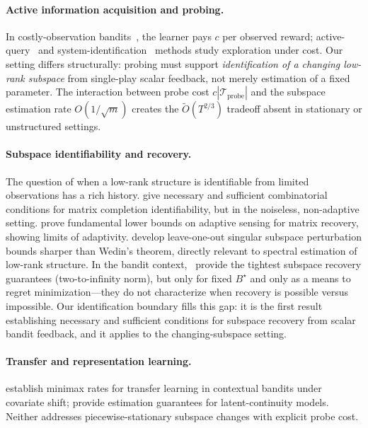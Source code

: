 \documentclass[11pt]{article}
\newcommand{\cTprobe}{\mathcal{T}_{\mathrm{probe}}}
\begin{document}
\paragraph{Active information acquisition and probing.}
In costly-observation bandits~\citep{seldin2014paid,tucker2023costly,elumar2025costly},
the learner pays $c$ per observed reward;
active-query~\citep{sekhari2023contextual} and
system-identification~\citep{memmel2024asid} methods study exploration under cost.
Our setting differs structurally: probing must support \emph{identification of a
changing low-rank subspace} from single-play scalar feedback, not merely estimation
of a fixed parameter.
The interaction between probe cost $c|\cTprobe|$ and the subspace estimation rate
$O(1/\sqrt{m})$ creates the $\widetilde{O}(T^{2/3})$ tradeoff absent in stationary
or unstructured settings.

\paragraph{Subspace identifiability and recovery.}
The question of when a low-rank structure is identifiable from limited observations
has a rich history.
\citet{kiraly2012identifiability} give necessary and sufficient combinatorial
conditions for matrix completion identifiability, but in the noiseless,
non-adaptive setting.
\citet{kacham2023adaptive} prove fundamental lower bounds on adaptive sensing
for matrix recovery, showing limits of adaptivity.
\citet{zhang2024subspace_aos} develop leave-one-out singular subspace perturbation
bounds sharper than Wedin's theorem, directly relevant to spectral estimation
of low-rank structure.
In the bandit context,~\citet{pmlr-v235-jedra24a} provide the tightest subspace
recovery guarantees (two-to-infinity norm), but only for fixed $B^\star$ and
only as a means to regret minimization---they do not characterize when
recovery is possible versus impossible.
Our identification boundary fills this gap: it is the first result establishing
necessary and sufficient conditions for subspace recovery from scalar bandit
feedback, and it applies to the changing-subspace setting.

\paragraph{Transfer and representation learning.}
\citet{cai2024transfer} establish minimax rates for transfer learning in
contextual bandits under covariate shift;
\citet{park2024latentcontinuity} provide estimation guarantees for latent-continuity
models.
Neither addresses piecewise-stationary subspace changes with explicit probe cost.
\end{document}
